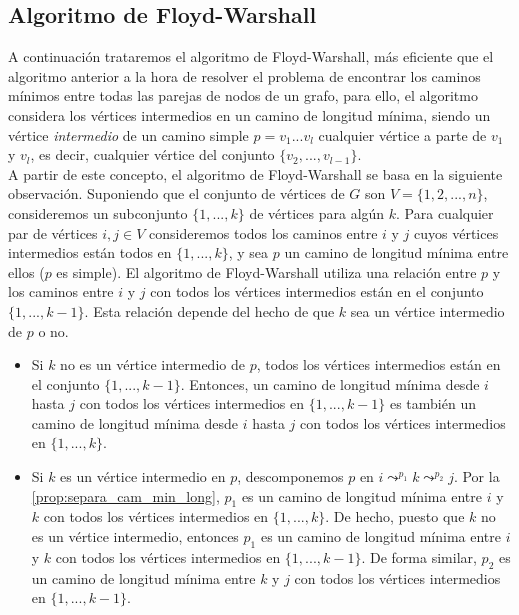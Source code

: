 \subsection{Algoritmo de Floyd-Warshall}\label{Floyd-Warshall}

A continuación trataremos el algoritmo de Floyd-Warshall, más eficiente que el algoritmo anterior a la hora de resolver el problema de encontrar los caminos mínimos entre todas las parejas de nodos de un grafo, para ello, el algoritmo considera los vértices intermedios en un camino de longitud mínima, siendo un vértice \textit{intermedio} de un camino simple $p=v_1...v_l$ cualquier vértice a parte de $v_1$ y $v_l$, es decir, cualquier vértice del conjunto $\{v_2,...,v_{l-1}\}$. \\

A partir de este concepto, el algoritmo de Floyd-Warshall se basa en la siguiente observación. Suponiendo que el conjunto de vértices de $G$ son $V=\{1,2,...,n\}$, consideremos un subconjunto $\{1,...,k\}$ de vértices para algún $k$. Para cualquier par de vértices $i,j\in V$ consideremos todos los caminos entre $i$ y $j$ cuyos vértices intermedios están todos en $\{1,...,k\}$, y sea $p$ un camino de longitud mínima entre ellos ($p$ es simple). El algoritmo de Floyd-Warshall utiliza una relación entre $p$ y los caminos entre $i$ y $j$ con todos los vértices intermedios están en el conjunto $\{1,...,k-1\}$. Esta relación depende del hecho de que $k$ sea un vértice intermedio de $p$ o no.

\begin{itemize}
	\item Si $k$ no es un vértice intermedio de $p$, todos los vértices intermedios están en el conjunto $\{1,...,k-1\}$. Entonces, un camino de longitud mínima desde $i$ hasta $j$ con todos los vértices intermedios en $\{1,...,k-1\}$ es también un camino de longitud mínima desde $i$ hasta $j$ con todos los vértices intermedios en $\{1,...,k\}$.
	\item Si $k$ es un vértice intermedio en $p$, descomponemos $p$ en $i\leadsto^{p_1}k\leadsto^{p_2}j$. Por la \autoref{prop:separa_cam_min_long}, $p_1$ es un camino de longitud mínima entre $i$ y $k$ con todos los vértices intermedios en $\{1,...,k\}$. De hecho, puesto que $k$ no es un vértice intermedio, entonces $p_1$ es un camino de longitud mínima entre $i$ y $k$ con todos los vértices intermedios en $\{1,...,k-1\}$. De forma similar, $p_2$ es un camino de longitud mínima entre $k$ y $j$ con todos los vértices intermedios en $\{1,...,k-1\}$.
\end{itemize}

